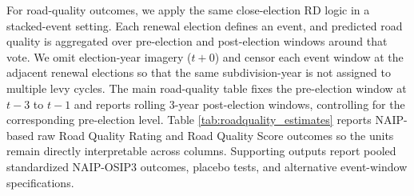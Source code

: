 For road-quality outcomes, we apply the same close-election RD logic in a stacked-event setting. Each renewal election defines an event, and predicted road quality is aggregated over pre-election and post-election windows around that vote. We omit election-year imagery ($t+0$) and censor each event window at the adjacent renewal elections so that the same subdivision-year is not assigned to multiple levy cycles. The main road-quality table fixes the pre-election window at $t-3$ to $t-1$ and reports rolling 3-year post-election windows, controlling for the corresponding pre-election level. Table \ref{tab:roadquality_estimates} reports NAIP-based raw Road Quality Rating and Road Quality Score outcomes so the units remain directly interpretable across columns. Supporting outputs report pooled standardized NAIP-OSIP3 outcomes, placebo tests, and alternative event-window specifications.
